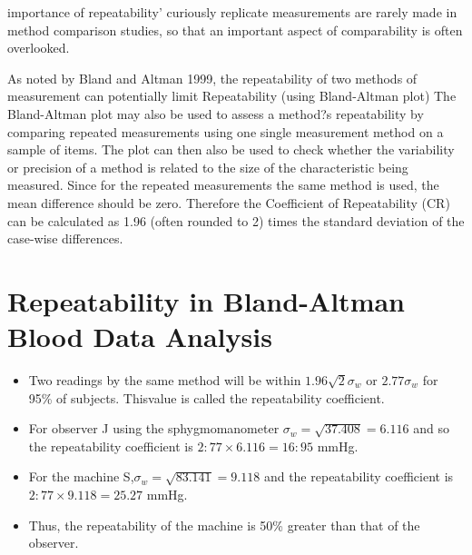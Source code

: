 \documentclass[12pt, a4paper]{report}
\theoremstyle{plain}
\theoremstyle{definition}
\theoremstyle{remark}
\begin{document}
	importance of repeatability' curiously replicate measurements are rarely made in method comparison studies, so that an important aspect of comparability is often overlooked.
	

	As noted by Bland and Altman 1999, the repeatability of two methods of measurement can  potentially limit
	Repeatability (using Bland-Altman plot)
	The Bland-Altman plot may also be used to assess a method?s repeatability by comparing repeated measurements using one single measurement method on a sample of items.
	The plot can then also be used to check whether the variability or precision of a method is related to the size of the characteristic being measured.
	Since for the repeated measurements the same method is used, the mean difference should be zero.
	Therefore the Coefficient of Repeatability (CR) can be calculated as 1.96 (often rounded to 2) times the standard deviation of the case-wise differences.
	


	\section{Repeatability in Bland-Altman Blood Data Analysis}
	\begin{itemize}
		\item Two readings by the same method will be within $1.96
		\sqrt{2} \sigma_w $ or $2.77 \sigma_w $ for 95\% of subjects. Thisvalue is called the repeatability coefficient.
		
		\item For observer J using the sphygmomanometer $ \sigma_w = \sqrt{37.408} = 6.116$ and so the repeatability coefficient is
		$2:77 \times 6.116 = 16:95$ mmHg.
		
		\item For the machine S,$ \sigma_w = \sqrt{83.141} = 9.118$ and the repeatability coefficient is $2:77 \times 9.118 = 25.27$ mmHg.
		
		\item Thus, the repeatability of the machine is 50\% greater than that of the observer.
	\end{itemize}

		
		
\end{document}
